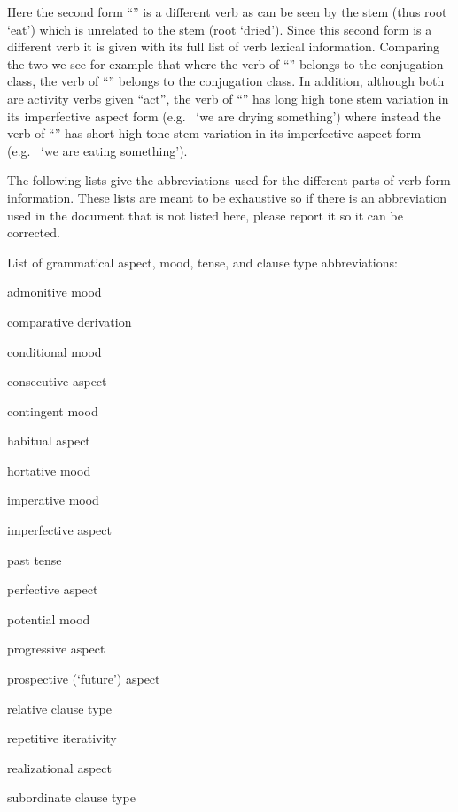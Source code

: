 Here the second form “” is a different verb as can be seen by the stem  (thus root  ‘eat’) which is unrelated to the stem  (root  ‘dried’).
Since this second form is a different verb it is given with its full list of verb lexical information.
Comparing the two we see for example that where the verb of “” belongs to the  conjugation class, the verb of “” belongs to the  conjugation class.
In addition, although both are activity verbs given “act”, the verb of “” has  long high tone stem variation in its imperfective aspect form (e.g.\  ‘we are drying something’) where instead the verb of “” has  short high tone stem variation in its imperfective aspect form (e.g.\  ‘we are eating something’).

The following lists give the abbreviations used for the different parts of verb form information.
These lists are meant to be exhaustive so if there is an abbreviation used in the document that is not listed here, please report it so it can be corrected.

\vspace{\baselineskip}
\noindent
List of grammatical aspect, mood, tense, and clause type abbreviations:
\begin{description}[font={\normalfont}, style=sameline, labelindent=\parindent, labelwidth=3em, leftmargin=!]
\item[admon]	admonitive mood
\item[cmpv]	comparative derivation
\item[cond]	conditional mood
\item[csec]	consecutive aspect
\item[ctng]	contingent mood
\item[hab]	habitual aspect
\item[hort]	hortative mood
\item[imp]	imperative mood
\item[impfv]	imperfective aspect
\item[past]	past tense
\item[pfv]	perfective aspect
\item[pot]	potential mood
\item[prog]	progressive aspect
\item[prosp]	prospective (‘future’) aspect
\item[rel]	relative clause type
\item[rep]	repetitive iterativity
\item[rlzn]	realizational aspect
\item[sub]	subordinate clause type
\end{description}

